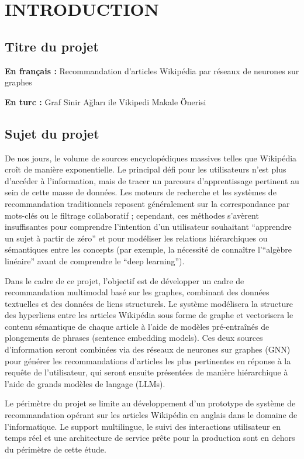 \chapter{INTRODUCTION}
\thispagestyle{empty} %

\section{Titre du projet}

\textbf{En français :} Recommandation d'articles Wikipédia par réseaux de neurones sur graphes

\textbf{En turc :} Graf Sinir Ağları ile Vikipedi Makale Önerisi

\section{Sujet du projet}

De nos jours, le volume de sources encyclopédiques massives telles que Wikipédia croît de manière exponentielle. Le principal défi pour les utilisateurs n'est plus d'accéder à l'information, mais de tracer un parcours d'apprentissage pertinent au sein de cette masse de données. Les moteurs de recherche et les systèmes de recommandation traditionnels reposent généralement sur la correspondance par mots-clés ou le filtrage collaboratif ; cependant, ces méthodes s'avèrent insuffisantes pour comprendre l'intention d'un utilisateur souhaitant ``apprendre un sujet à partir de zéro'' et pour modéliser les relations hiérarchiques ou sémantiques entre les concepts (par exemple, la nécessité de connaître l'``algèbre linéaire'' avant de comprendre le ``deep learning'').

Dans le cadre de ce projet, l'objectif est de développer un cadre de recommandation multimodal basé sur les graphes, combinant des données textuelles et des données de liens structurels. Le système modélisera la structure des hyperliens entre les articles Wikipédia sous forme de graphe et vectorisera le contenu sémantique de chaque article à l'aide de modèles pré-entraînés de plongements de phrases (sentence embedding models). Ces deux sources d'information seront combinées via des réseaux de neurones sur graphes (GNN) pour générer les recommandations d'articles les plus pertinentes en réponse à la requête de l'utilisateur, qui seront ensuite présentées de manière hiérarchique à l'aide de grands modèles de langage (LLMs).

Le périmètre du projet se limite au développement d'un prototype de système de recommandation opérant sur les articles Wikipédia en anglais dans le domaine de l'informatique. Le support multilingue, le suivi des interactions utilisateur en temps réel et une architecture de service prête pour la production sont en dehors du périmètre de cette étude.

